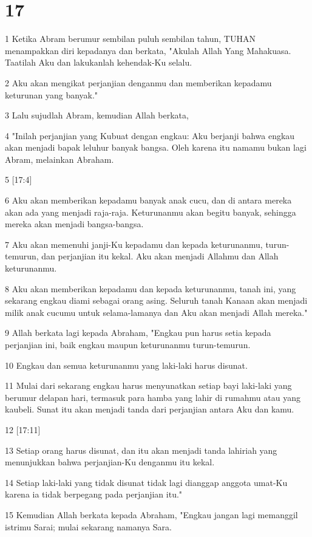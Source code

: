 \chapter{17}

\par 1 Ketika Abram berumur sembilan puluh sembilan tahun, TUHAN menampakkan diri kepadanya dan berkata, "Akulah Allah Yang Mahakuasa. Taatilah Aku dan lakukanlah kehendak-Ku selalu.
\par 2 Aku akan mengikat perjanjian denganmu dan memberikan kepadamu keturunan yang banyak."
\par 3 Lalu sujudlah Abram, kemudian Allah berkata,
\par 4 "Inilah perjanjian yang Kubuat dengan engkau: Aku berjanji bahwa engkau akan menjadi bapak leluhur banyak bangsa. Oleh karena itu namamu bukan lagi Abram, melainkan Abraham.
\par 5 [17:4]
\par 6 Aku akan memberikan kepadamu banyak anak cucu, dan di antara mereka akan ada yang menjadi raja-raja. Keturunanmu akan begitu banyak, sehingga mereka akan menjadi bangsa-bangsa.
\par 7 Aku akan memenuhi janji-Ku kepadamu dan kepada keturunanmu, turun-temurun, dan perjanjian itu kekal. Aku akan menjadi Allahmu dan Allah keturunanmu.
\par 8 Aku akan memberikan kepadamu dan kepada keturunanmu, tanah ini, yang sekarang engkau diami sebagai orang asing. Seluruh tanah Kanaan akan menjadi milik anak cucumu untuk selama-lamanya dan Aku akan menjadi Allah mereka."
\par 9 Allah berkata lagi kepada Abraham, "Engkau pun harus setia kepada perjanjian ini, baik engkau maupun keturunanmu turun-temurun.
\par 10 Engkau dan semua keturunanmu yang laki-laki harus disunat.
\par 11 Mulai dari sekarang engkau harus menyunatkan setiap bayi laki-laki yang berumur delapan hari, termasuk para hamba yang lahir di rumahmu atau yang kaubeli. Sunat itu akan menjadi tanda dari perjanjian antara Aku dan kamu.
\par 12 [17:11]
\par 13 Setiap orang harus disunat, dan itu akan menjadi tanda lahiriah yang menunjukkan bahwa perjanjian-Ku denganmu itu kekal.
\par 14 Setiap laki-laki yang tidak disunat tidak lagi dianggap anggota umat-Ku karena ia tidak berpegang pada perjanjian itu."
\par 15 Kemudian Allah berkata kepada Abraham, "Engkau jangan lagi memanggil istrimu Sarai; mulai sekarang namanya Sara.
